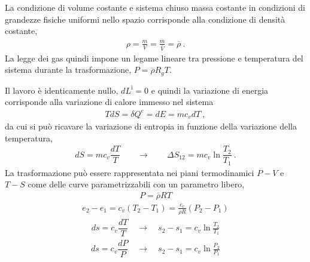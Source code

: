 \documentclass[letterpaper,10pt,italian]{jupyterBook}
\begin{document}
\sphinxAtStartPar
{} La condizione di volume costante e sistema chiuso \sphinxhyphen{} massa costante \sphinxhyphen{} in condizioni di grandezze fisiche uniformi nello spazio corrisponde alla condizione di densità costante,
\begin{equation*}
\begin{split}\rho = \frac{m}{V} = \frac{\overline{m}}{\overline{V}} = \overline{\rho} \ .\end{split}
\end{equation*}
\sphinxAtStartPar
La legge dei gas quindi impone un legame lineare tra pressione e temperatura del sistema durante la trasformazione, \(P = \overline{\rho} R_g T\).

\sphinxAtStartPar
Il lavoro è identicamente nullo, \(d L^ì = 0\) e quindi la variazione di energia corrisponde alla variazione di calore immesso nel sistema
\begin{equation*}
\begin{split}T dS = \delta Q^e = d E = m c_v dT \ ,\end{split}
\end{equation*}
\sphinxAtStartPar
da cui si può ricavare la variazione di entropia in funzione della variazione della temperatura,
\begin{equation*}
\begin{split}d S = m c_v \dfrac{d T}{T} \qquad \rightarrow \qquad \Delta S_{12} = m c_v \ln \dfrac{T_2}{T_1} \ .\end{split}
\end{equation*}
\sphinxAtStartPar
La trasformazione può essere rappresentata nei piani termodinamici \(P-V\) e \(T-S\) come delle curve parametrizzabili con un parametro libero,
\begin{equation*}
\begin{split}P = \overline{\rho} R T\end{split}
\end{equation*}\begin{equation*}
\begin{split}e_2 - e_1 = c_v (T_2 - T_1) = \frac{c_v}{\overline{\rho} R} (P_2 - P_1)\end{split}
\end{equation*}\begin{equation*}
\begin{split}d s = c_v \dfrac{dT}{T} \quad \rightarrow \quad s_2 - s_1 = c_v \ln \frac{T_2}{T_1} \end{split}
\end{equation*}\begin{equation*}
\begin{split}d s = c_v \dfrac{dP}{P} \quad \rightarrow \quad s_2 - s_1 = c_v \ln \frac{P_2}{P_1} \end{split}
\end{equation*}
\end{document}
